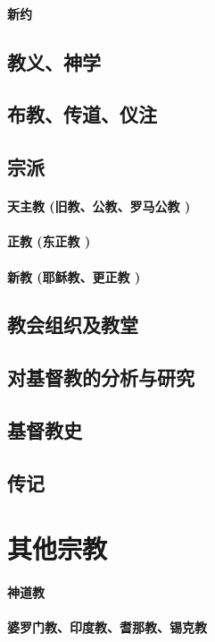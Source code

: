 \documentclass[UTF8]{../RepresentationUniverse}
\begin{document}
    \subsubsection{新约}
\section{教义、神学}
\section{布教、传道、仪注}
\section{宗派}
    \subsubsection{天主教 (旧教、公教、罗马公教 )}
    \subsubsection{正教 (东正教 )}
    \subsubsection{新教 (耶稣教、更正教 )}
\section{教会组织及教堂}
\section{对基督教的分析与研究}
\section{基督教史}
\section{传记}


\chapter{其他宗教}
    \subsubsection{神道教}
    \subsubsection{婆罗门教、印度教、耆那教、锡克教}
\end{document}
